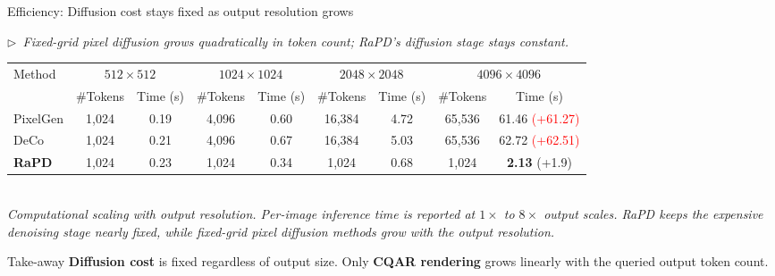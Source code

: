 \documentclass[aspectratio=169,10pt]{beamer}
\newcommand{\hl}[1]{\textcolor{rapdorange}{\textbf{#1}}}
\newcommand{\story}[1]{%
  {\color{rapdgray}\itshape\footnotesize $\triangleright$~#1\par}\vspace{0.3em}}
\begin{document}
\begin{frame}{Efficiency: \alert{Diffusion cost stays fixed} as output resolution grows}
  \story{Fixed-grid pixel diffusion grows quadratically in token count; RaPD's diffusion stage stays constant.}
  \vspace{0.5em}
  \begin{center}
  \scriptsize
  \setlength{\tabcolsep}{4pt}
  \begin{tabular}{l|cc|cc|cc|cc}
    \toprule
    \multirow{2}{*}{Method} &
    \multicolumn{2}{c|}{$512\!\times\!512$} &
    \multicolumn{2}{c|}{$1024\!\times\!1024$} &
    \multicolumn{2}{c|}{$2048\!\times\!2048$} &
    \multicolumn{2}{c}{$4096\!\times\!4096$} \\
     &
    \#Tokens & Time (s) &
    \#Tokens & Time (s) &
    \#Tokens & Time (s) &
    \#Tokens & Time (s) \\
    \midrule
    PixelGen        & 1{,}024 & 0.19 & 4{,}096  & 0.60 & 16{,}384 & 4.72 & 65{,}536 & 61.46 \textcolor{red}{(+61.27)} \\
    DeCo            & 1{,}024 & 0.21 & 4{,}096  & 0.67 & 16{,}384 & 5.03 & 65{,}536 & 62.72 \textcolor{red}{(+62.51)} \\
    \rowcolor{lightbluepurple}
    \textbf{RaPD}   & 1{,}024 & 0.23 & 1{,}024  & 0.34 & 1{,}024  & 0.68 & 1{,}024  & \textbf{2.13} {\color{rapdorange}(+1.9)} \\
    \bottomrule
  \end{tabular}\\[0.4em]
  {\scriptsize\itshape\color{rapdgray}Computational scaling with output resolution. Per-image inference time is reported at $1\!\times\!$ to $8\!\times\!$ output scales. RaPD keeps the expensive denoising stage nearly fixed, while fixed-grid pixel diffusion methods grow with the output resolution.}
  \end{center}
  \vspace{0.5em}
  \begin{block}{Take-away}
    \centering
    \hl{Diffusion cost} is fixed regardless of output size.
    Only \hl{CQAR rendering} grows linearly with the queried output token count.
  \end{block}
\end{frame}
\end{document}
